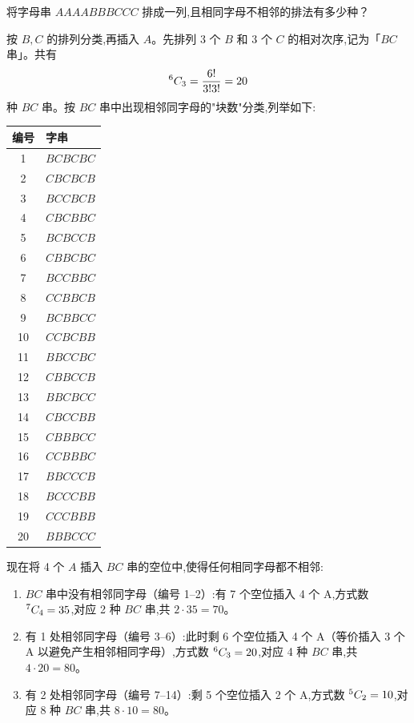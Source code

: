 \begin{questions}
    \question 将字母串 $AAAABBBCCC$ 排成一列,且相同字母不相邻的排法有多少种？
    \begin{solution}
        按 $B,C$ 的排列分类,再插入 $A$。先排列 3 个 $B$ 和 3 个 $C$ 的相对次序,记为「$BC$ 串」。共有
        \[
        {}^{6}C_{3}=\frac{6!}{3!3!}=20
        \]
        种 $BC$ 串。按 $BC$ 串中出现相邻同字母的"块数"分类,列举如下:
        \begin{center}
        \begin{tabular}{c|l}
        编号 & 字串 \\ \hline 
        1 & $BCBCBC$ \\ 
        2 & $CBCBCB$ \\ \hline 
        3 & $BCCBCB$ \\ 
        4 & $CBCBBC$ \\ 
        5 & $BCBCCB$ \\ 
        6 & $CBBCBC$ \\ \hline 
        7 & $BCCBBC$ \\ 
        8 & $CCBBCB$ \\ 
        9 & $BCBBCC$ \\ 
        10 & $CCBCBB$ \\ 
        11 & $BBCCBC$ \\ 
        12 & $CBBCCB$ \\ 
        13 & $BBCBCC$ \\ 
        14 & $CBCCBB$ \\ \hline 
        15 & $CBBBCC$ \\ 
        16 & $CCBBBC$ \\ 
        17 & $BBCCCB$ \\ 
        18 & $BCCCBB$ \\ \hline 
        19 & $CCCBBB$ \\ 
        20 & $BBBCCC$ \\ \hline
        \end{tabular}
        \end{center}
        现在将 4 个 $A$ 插入 $BC$ 串的空位中,使得任何相同字母都不相邻:
        \begin{enumerate}
            \item $BC$ 串中没有相邻同字母（编号 1--2）:有 7 个空位插入 4 个 A,方式数 ${}^{7}C_{4}=35$,对应 2 种 $BC$ 串,共 $2\cdot 35=70$。
            \item 有 1 处相邻同字母（编号 3--6）:此时剩 6 个空位插入 4 个 A（等价插入 3 个 A 以避免产生相邻相同字母）,方式数 ${}^{6}C_{3}=20$,对应 4 种 $BC$ 串,共 $4\cdot20=80$。
            \item 有 2 处相邻同字母（编号 7--14）:剩 5 个空位插入 2 个 A,方式数 ${}^{5}C_{2}=10$,对应 8 种 $BC$ 串,共 $8\cdot10=80$。

\end{enumerate}
\end{solution}
\end{questions}
